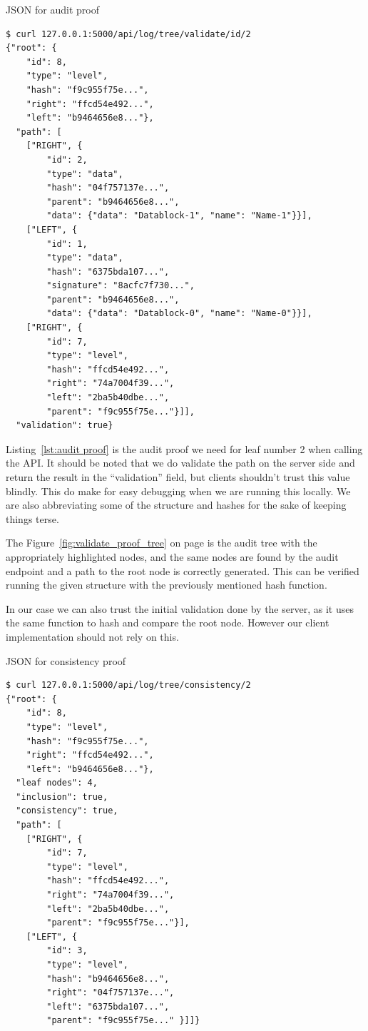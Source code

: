 \documentclass[../Main/thesis.tex]{subfiles}
\begin{document}
\begin{listing}[H]
\caption{JSON for audit proof}
\label{lst:audit proof}
\begin{verbatim}
$ curl 127.0.0.1:5000/api/log/tree/validate/id/2
{"root": {
    "id": 8,
    "type": "level",
    "hash": "f9c955f75e...",
    "right": "ffcd54e492...",
    "left": "b9464656e8..."},
  "path": [
    ["RIGHT", {
        "id": 2,
        "type": "data",
        "hash": "04f757137e...",
        "parent": "b9464656e8...",
        "data": {"data": "Datablock-1", "name": "Name-1"}}],
    ["LEFT", {
        "id": 1,
        "type": "data",
        "hash": "6375bda107...",
        "signature": "8acfc7f730...",
        "parent": "b9464656e8...",
        "data": {"data": "Datablock-0", "name": "Name-0"}}],
    ["RIGHT", {
        "id": 7,
        "type": "level",
        "hash": "ffcd54e492...",
        "right": "74a7004f39...",
        "left": "2ba5b40dbe...",
        "parent": "f9c955f75e..."}]],
  "validation": true}
\end{verbatim}
\end{listing}

Listing~\ref{lst:audit proof} is the audit proof we need for leaf number 2 when
calling the API. It should be noted that we do validate the path on the server
side and return the result in the ``validation'' field, but clients shouldn't
trust this value blindly. This do make for easy debugging when we are running
this locally. We are also abbreviating some of the structure and hashes for the
sake of keeping things terse.

The Figure~\ref{fig:validate_proof_tree} on page
\pageref{fig:validate_proof_tree} is the audit tree with the appropriately
highlighted nodes, and the same nodes are found by the audit endpoint and a path
to the root node is correctly generated. This can be verified running the given
structure with the previously mentioned hash function.

In our case we can also trust the initial validation done by the server, as it
uses the same function to hash and compare the root node. However our client
implementation should not rely on this.


\begin{listing}[H]
\caption{JSON for consistency proof}
\label{lst:consistency proof}
\begin{verbatim}
$ curl 127.0.0.1:5000/api/log/tree/consistency/2
{"root": {
    "id": 8,
    "type": "level",
    "hash": "f9c955f75e...",
    "right": "ffcd54e492...",
    "left": "b9464656e8..."},
  "leaf nodes": 4,
  "inclusion": true,
  "consistency": true,
  "path": [
    ["RIGHT", {
        "id": 7,
        "type": "level",
        "hash": "ffcd54e492...",
        "right": "74a7004f39...",
        "left": "2ba5b40dbe...",
        "parent": "f9c955f75e..."}],
    ["LEFT", {
        "id": 3,
        "type": "level",
        "hash": "b9464656e8...",
        "right": "04f757137e...",
        "left": "6375bda107...",
        "parent": "f9c955f75e..." }]]}
\end{verbatim}
\end{listing}
\end{document}
